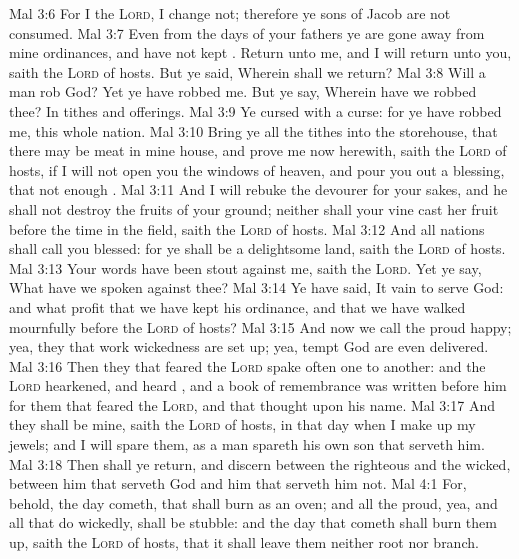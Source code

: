 \vs Mal 3:6 For I  the \textsc{Lord}, I change not; therefore ye sons of Jacob are not consumed.
\vs Mal 3:7 Even from the days of your fathers ye are gone away from mine ordinances, and have not kept . Return unto me, and I will return unto you, saith the \textsc{Lord} of hosts. But ye said, Wherein shall we return?
\vs Mal 3:8 Will a man rob God? Yet ye have robbed me. But ye say, Wherein have we robbed thee? In tithes and offerings.
\vs Mal 3:9 Ye  cursed with a curse: for ye have robbed me,  this whole nation.
\vs Mal 3:10 Bring ye all the tithes into the storehouse, that there may be meat in mine house, and prove me now herewith, saith the \textsc{Lord} of hosts, if I will not open you the windows of heaven, and pour you out a blessing, that  not  enough .
\vs Mal 3:11 And I will rebuke the devourer for your sakes, and he shall not destroy the fruits of your ground; neither shall your vine cast her fruit before the time in the field, saith the \textsc{Lord} of hosts.
\vs Mal 3:12 And all nations shall call you blessed: for ye shall be a delightsome land, saith the \textsc{Lord} of hosts.
\vs Mal 3:13 Your words have been stout against me, saith the \textsc{Lord}. Yet ye say, What have we spoken  against thee?
\vs Mal 3:14 Ye have said, It  vain to serve God: and what profit  that we have kept his ordinance, and that we have walked mournfully before the \textsc{Lord} of hosts?
\vs Mal 3:15 And now we call the proud happy; yea, they that work wickedness are set up; yea,  tempt God are even delivered.
\vs Mal 3:16 Then they that feared the \textsc{Lord} spake often one to another: and the \textsc{Lord} hearkened, and heard , and a book of remembrance was written before him for them that feared the \textsc{Lord}, and that thought upon his name.
\vs Mal 3:17 And they shall be mine, saith the \textsc{Lord} of hosts, in that day when I make up my jewels; and I will spare them, as a man spareth his own son that serveth him.
\vs Mal 3:18 Then shall ye return, and discern between the righteous and the wicked, between him that serveth God and him that serveth him not.
\vs Mal 4:1 For, behold, the day cometh, that shall burn as an oven; and all the proud, yea, and all that do wickedly, shall be stubble: and the day that cometh shall burn them up, saith the \textsc{Lord} of hosts, that it shall leave them neither root nor branch.
